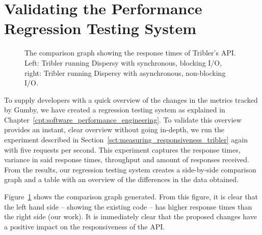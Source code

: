 \section{Validating the Performance Regression Testing System}
\label{sct:validation_performance_regression_testing_system}

\begin{figure}[!h]
	\centering
	\caption{The comparison graph showing the response times of Tribler's API. Left: Tribler running Dispersy with synchronous, blocking I/O, right: Tribler running Dispersy with asynchronous, non-blocking I/O.}
	\label{fig:tribler_response_times_comparison}
\end{figure} 

To supply developers with a quick overview of the changes in the metrics tracked by Gumby, we have created a regression testing system as explained in Chapter~\ref{cpt:software_performance_engineering}.
To validate this overview provides an instant, clear overview without going in-depth, we run the experiment described in Section~\ref{sct:measuring_responsiveness_tribler} again with five requests per second.
This experiment captures the response times, variance in said response times, throughput and amount of responses received.
From the results, our regression testing system creates a side-by-side comparison graph and a table with an overview of the differences in the data obtained.

Figure~\ref{fig:tribler_response_times_comparison} shows the comparison graph generated.
From this figure, it is clear that the left hand side -- showing the existing code -- has higher response times than the right side (our work).
It is immediately clear that the proposed changes have a positive impact on the responsiveness of the API.

